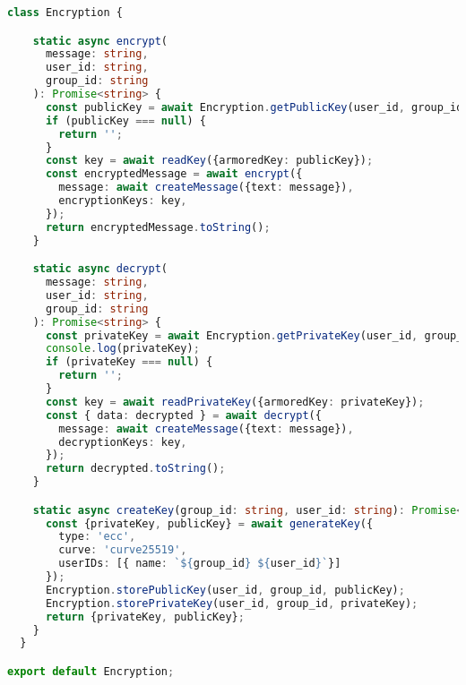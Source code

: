 \begin{lstlisting}[language=TypeScript, caption=Encryption des messages]% Ajout d'un bloc de code
  class Encryption {

    static async encrypt(
      message: string,
      user_id: string,
      group_id: string
    ): Promise<string> {
      const publicKey = await Encryption.getPublicKey(user_id, group_id);
      if (publicKey === null) {
        return '';
      }
      const key = await readKey({armoredKey: publicKey});
      const encryptedMessage = await encrypt({
        message: await createMessage({text: message}),
        encryptionKeys: key,
      });
      return encryptedMessage.toString();
    }

    static async decrypt(
      message: string,
      user_id: string,
      group_id: string
    ): Promise<string> {
      const privateKey = await Encryption.getPrivateKey(user_id, group_id);
      console.log(privateKey);
      if (privateKey === null) {
        return '';
      }
      const key = await readPrivateKey({armoredKey: privateKey});
      const { data: decrypted } = await decrypt({
        message: await createMessage({text: message}),
        decryptionKeys: key,
      });
      return decrypted.toString();
    }

    static async createKey(group_id: string, user_id: string): Promise<any> {
      const {privateKey, publicKey} = await generateKey({
        type: 'ecc',
        curve: 'curve25519',
        userIDs: [{ name: `${group_id} ${user_id}`}]
      });
      Encryption.storePublicKey(user_id, group_id, publicKey);
      Encryption.storePrivateKey(user_id, group_id, privateKey);
      return {privateKey, publicKey};
    }
  }

export default Encryption;
\end{lstlisting}

